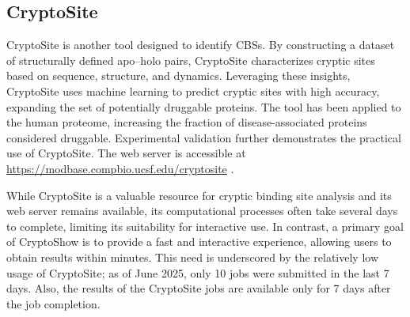\subsection{CryptoSite}
\label{sec:cryptosite}

CryptoSite is another tool designed to identify CBSs. By constructing a dataset of structurally defined apo–holo pairs, CryptoSite characterizes cryptic sites based on sequence, structure, and dynamics. Leveraging these insights, CryptoSite uses machine learning to predict cryptic sites with high accuracy, expanding the set of potentially druggable proteins. The tool has been applied to the human proteome, increasing the fraction of disease-associated proteins considered druggable. Experimental validation further demonstrates the practical use of CryptoSite. The web server is accessible at \url{https://modbase.compbio.ucsf.edu/cryptosite} \cite{cimermancic2016cryptosite}.

While CryptoSite is a valuable resource for cryptic binding site analysis and its web server remains available, its computational processes often take several days to complete, limiting its suitability for interactive use. In contrast, a primary goal of CryptoShow is to provide a fast and interactive experience, allowing users to obtain results within minutes. This need is underscored by the relatively low usage of CryptoSite; as of June 2025, only 10 jobs were submitted in the last 7 days. Also, the results of the CryptoSite jobs are available only for 7 days after the job completion.
